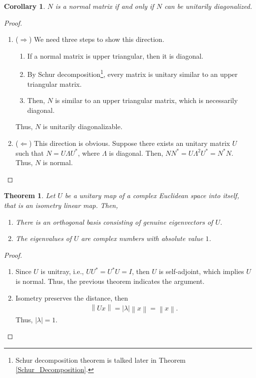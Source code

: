 \documentclass[11pt]{book}
\newtheorem{theorem}{Theorem}[chapter]
\newtheorem{corollary}{Corollary}[theorem]
\theoremstyle{definition}
\numberwithin{equation}{chapter}
\begin{document}
\begin{corollary}\label{normal_matrix_unitary_diagonal}
$N$ is a normal matrix if and only if $N$ can be unitarily diagonalized.
\end{corollary}
\begin{proof}
~\begin{enumerate}[label=(\alph*)]
    \item ($\Rightarrow$) We need three steps to show this direction\cite{25}.
    \begin{enumerate}[label=\arabic**)]
        \item If a normal matrix is upper triangular, then it is diagonal.
        
        \item By Schur decomposition\footnote{Schur decomposition theorem is talked later in Theorem \ref{Schur_Decomposition}.}, every matrix is unitary similar to an upper triangular matrix.
        
        \item Then, $N$ is similar to an upper triangular matrix, which is necessarily diagonal.
    \end{enumerate}
    Thus, $N$ is unitarily diagonalizable. 
    
    \item ($\Leftarrow$) This direction is obvious. Suppose there exists an unitary matrix $U$ such that $N = U \Lambda U^*$, where $\Lambda$ is diagonal. Then, $N N^* = U \Lambda^2 U^* = N^* N$. Thus, $N$ is normal.
\end{enumerate}
\end{proof}

\medskip

\begin{theorem}\label{isometry_property}
Let $U$ be a unitary map of a complex Euclidean space into itself, that is an isometry linear map. Then,
\begin{enumerate}[label=(\alph*)]
    \item There is an orthogonal basis consisting of genuine eigenvectors of $U$.
    \item The eigenvalues of $U$ are complex numbers with absolute value $1$.
\end{enumerate}
\end{theorem}
\begin{proof}
~\begin{enumerate}[label=(\alph*)]
    \item Since $U$ is unitray, i.e., $UU^* = U^*U = I$, then $U$ is self-adjoint, which implies $U$ is normal. Thus,  the previous theorem indicates the argument.
    \item Isometry preserves the distance, then 
    \begin{align*}
        \left\|Ux\right\| = |\lambda| \left\|x\right\| = \left\|x\right\|.
    \end{align*}
    Thus, $\left|\lambda\right| = 1$.
\end{enumerate}
\end{proof}
\end{document}

